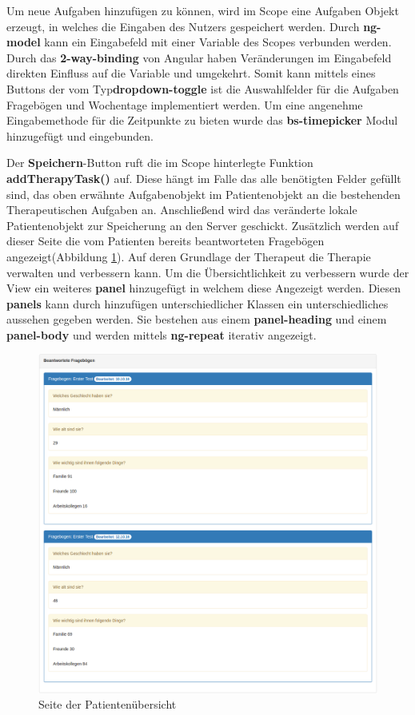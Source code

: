 Um neue Aufgaben hinzufügen zu können, wird im Scope eine Aufgaben Objekt erzeugt, in welches die Eingaben des Nutzers gespeichert werden. Durch \textbf{ng-model} kann ein Eingabefeld mit einer Variable des Scopes verbunden werden. Durch das \textbf{2-way-binding} von Angular haben Veränderungen im Eingabefeld direkten Einfluss auf die Variable und umgekehrt. Somit kann mittels eines Buttons der vom Typ\textbf{dropdown-toggle} ist die Auswahlfelder für die Aufgaben Fragebögen und Wochentage implementiert werden.
Um eine angenehme Eingabemethode für die Zeitpunkte zu bieten wurde das \textbf{bs-timepicker} Modul hinzugefügt und eingebunden.

Der \textbf{Speichern}-Button ruft die im Scope hinterlegte Funktion \textbf{addTherapyTask()} auf. Diese hängt im Falle das alle benötigten Felder gefüllt sind, das oben erwähnte Aufgabenobjekt im Patientenobjekt an die bestehenden Therapeutischen Aufgaben an. Anschließend wird das veränderte lokale Patientenobjekt zur Speicherung an den Server geschickt.
Zusätzlich werden auf dieser Seite die vom Patienten bereits beantworteten Fragebögen angezeigt(Abbildung \ref{PatientDetailsFrageboegen}). Auf deren Grundlage der Therapeut die Therapie verwalten und verbessern kann. Um die Übersichtlichkeit zu verbessern wurde der View ein weiteres \textbf{panel} hinzugefügt in welchem diese Angezeigt werden. Diesen \textbf{panels} kann durch hinzufügen unterschiedlicher Klassen ein unterschiedliches aussehen gegeben werden. Sie bestehen aus einem \textbf{panel-heading} und einem \textbf{panel-body} und werden mittels \textbf{ng-repeat} iterativ angezeigt. 

\begin{figure}[H]
	\centering
	\includegraphics[scale=0.3]{images/Screenshots/PatientDetailsFrageboegen}
	\caption[Seite der Patientenübersicht]{Seite der Patientenübersicht}
	\label{PatientDetailsFrageboegen}
\end{figure}



